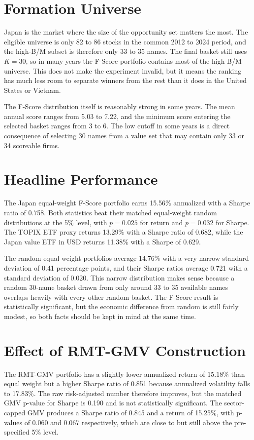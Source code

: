 \documentclass[11pt,a4paper]{report}
\numberwithin{figure}{chapter}
\numberwithin{table}{chapter}
\numberwithin{equation}{chapter}
\begin{document}
\section{Formation Universe}

Japan is the market where the size of the opportunity set matters the most. The eligible universe is only 82 to 86 stocks in the common 2012 to 2024 period, and the high-B/M subset is therefore only 33 to 35 names. The final basket still uses $K=30$, so in many years the F-Score portfolio contains most of the high-B/M universe. This does not make the experiment invalid, but it means the ranking has much less room to separate winners from the rest than it does in the United States or Vietnam.

The F-Score distribution itself is reasonably strong in some years. The mean annual score ranges from 5.03 to 7.22, and the minimum score entering the selected basket ranges from 3 to 6. The low cutoff in some years is a direct consequence of selecting 30 names from a value set that may contain only 33 or 34 scoreable firms.

\section{Headline Performance}

The Japan equal-weight F-Score portfolio earns 15.56\% annualized with a Sharpe ratio of 0.758. Both statistics beat their matched equal-weight random distributions at the 5\% level, with $p=0.025$ for return and $p=0.032$ for Sharpe. The TOPIX ETF proxy returns 13.29\% with a Sharpe ratio of 0.682, while the Japan value ETF in USD returns 11.38\% with a Sharpe of 0.629.

The random equal-weight portfolios average 14.76\% with a very narrow standard deviation of 0.41 percentage points, and their Sharpe ratios average 0.721 with a standard deviation of 0.020. This narrow distribution makes sense because a random 30-name basket drawn from only around 33 to 35 available names overlaps heavily with every other random basket. The F-Score result is statistically significant, but the economic difference from random is still fairly modest, so both facts should be kept in mind at the same time.

\section{Effect of RMT-GMV Construction}

The RMT-GMV portfolio has a slightly lower annualized return of 15.18\% than equal weight but a higher Sharpe ratio of 0.851 because annualized volatility falls to 17.83\%. The raw risk-adjusted number therefore improves, but the matched GMV p-value for Sharpe is 0.190 and is not statistically significant. The sector-capped GMV produces a Sharpe ratio of 0.845 and a return of 15.25\%, with p-values of 0.060 and 0.067 respectively, which are close to but still above the pre-specified 5\% level.
\end{document}
